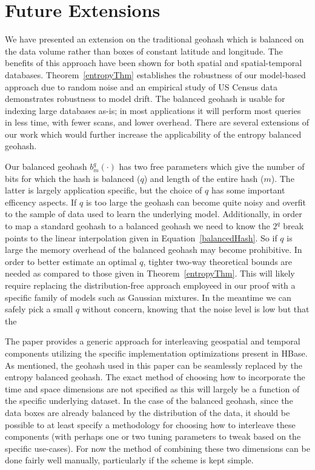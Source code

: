 \documentclass[nips13submit_09,times,art10]{article} %
\begin{document}
\section{Future Extensions}  \label{sec:future}

We have presented an extension on the traditional geohash which is balanced on the data
volume rather than boxes of constant latitude and longitude. The benefits of this approach
have been shown for both spatial and spatial-temporal databases. Theorem~\ref{entropyThm}
establishes the robustness of our model-based approach due to random noise and an empirical
study of US Census data demonstrates robustness to model drift. The balanced geohash is
usable for indexing large databases as-is; in most applications it will perform most queries
in less time, with fewer scans, and lower overhead. There are several extensions of our
work which would further increase the applicability of the entropy balanced geohash.

Our balanced geohash $b^q_m(\cdot)$ has two free parameters which give the number of bits for which
the hash is balanced ($q$) and length of the entire hash ($m$). The latter is largely
application specific, but the choice of $q$ has some important efficency aspects. If $q$ is
too large the geohash can become quite noisy and overfit to the sample of data used to
learn the underlying model. Additionally, in order to map a standard geohash to a balanced
geohash we need to know the $2^q$ break points to the linear interpolation given in
Equation~\ref{balancedHash}. So if $q$ is large the memory overhead of the balanced
geohash may become prohibitive. In order to better estimate an optimal $q$, tighter two-way
theoretical bounds are needed as compared to those given in Theorem~\ref{entropyThm}. This
will likely require replacing the distribution-free approach employeed in our proof with a
specific family of models such as Gaussian mixtures. In the meantime we can safely pick a
small $q$ without concern, knowing that the noise level is low but that the

The paper \cite{han2013hgrid} provides a generic approach for interleaving geospatial
and temporal components utilizing the specific implementation optimizations present in
HBase. As mentioned, the geohash used in this paper can be seamlessly replaced by the
entropy balanced geohash. The exact method of choosing how to incorporate the time and
space dimensions are not specified as this will largely be a function of the specific
underlying dataset. In the case of the balanced geohash, since the data boxes are
already balanced by the distribution of the data, it should be possible to at least
specify a methodology for choosing how to interleave these components (with perhaps
one or two tuning parameters to tweak based on the specific use-cases). For now the
method of combining these two dimensions can be done fairly well manually, particularly
if the scheme is kept simple.
\end{document}
